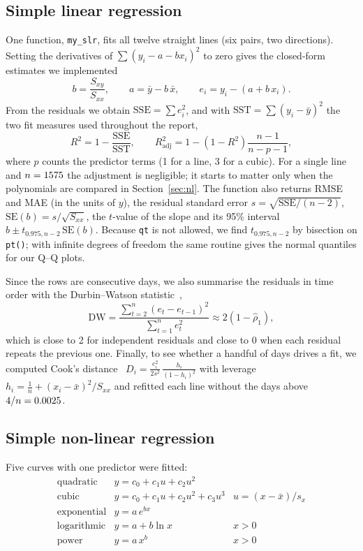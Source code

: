\documentclass[11pt,a4paper]{article}
\newcommand{\Rsq}{R^2}
\begin{document}
\subsection{Simple linear regression}
One function, \texttt{my\_slr}, fits all twelve straight lines (six pairs, two
directions). Setting the derivatives of $\sum(y_i-a-bx_i)^2$ to zero gives the
closed-form estimates we implemented~\cite{montgomery}
\[
  b=\frac{S_{xy}}{S_{xx}},\qquad a=\bar y-b\,\bar x,\qquad e_i=y_i-(a+b\,x_i).
\]
From the residuals we obtain $\mathrm{SSE}=\sum e_i^2$, and with
$\mathrm{SST}=\sum(y_i-\bar y)^2$ the two fit measures used throughout the report,
\[
  \Rsq = 1-\frac{\mathrm{SSE}}{\mathrm{SST}},\qquad
  \Rsq_{\mathrm{adj}} = 1-(1-\Rsq)\frac{n-1}{n-p-1},
\]
where $p$ counts the predictor terms (1 for a line, 3 for a cubic). For a single
line and $n=1575$ the adjustment is negligible; it starts to matter only when the
polynomials are compared in Section~\ref{sec:nl}. The function also returns RMSE and
MAE (in the units of $y$), the residual standard error $s=\sqrt{\mathrm{SSE}/(n-2)}$,
$\mathrm{SE}(b)=s/\sqrt{S_{xx}}$, the $t$-value of the slope and its 95\% interval
$b\pm t_{0.975,n-2}\,\mathrm{SE}(b)$. Because \texttt{qt} is not allowed, we find
$t_{0.975,n-2}$ by bisection on \texttt{pt()}; with infinite degrees of freedom the
same routine gives the normal quantiles for our Q--Q plots.

Since the rows are consecutive days, we also summarise the residuals in time order
with the Durbin--Watson statistic~\cite{durbin},
\[
  \mathrm{DW}=\frac{\sum_{t=2}^{n}(e_t-e_{t-1})^2}{\sum_{t=1}^{n}e_t^2}\approx 2(1-\hat\rho_1),
\]
which is close to 2 for independent residuals and close to 0 when each residual
repeats the previous one. Finally, to see whether a handful of days drives a fit, we
computed Cook's distance~\cite{cook}
$D_i=\frac{e_i^2}{2s^2}\,\frac{h_i}{(1-h_i)^2}$ with leverage
$h_i=\frac1n+(x_i-\bar x)^2/S_{xx}$ and refitted each line without the days above
$4/n=0.0025$.

\subsection{Simple non-linear regression}
\label{sec:method-nl}
Five curves with one predictor were fitted:
\[
\begin{array}{lll}
  \text{quadratic}   & y=c_0+c_1u+c_2u^2 & \\
  \text{cubic}       & y=c_0+c_1u+c_2u^2+c_3u^3 & u=(x-\bar x)/s_x\\
  \text{exponential} & y=a\,e^{bx} & \\
  \text{logarithmic} & y=a+b\ln x & x>0\\
  \text{power}       & y=a\,x^{b} & x>0
\end{array}
\]
\end{document}
